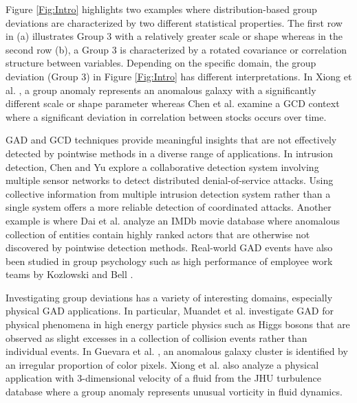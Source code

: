  Figure \ref{Fig:Intro} highlights two examples where distribution-based group deviations are characterized by two different statistical properties. The first row in (a) illustrates Group 3 with a relatively greater  scale or shape whereas in the second row (b),  a Group 3 is characterized by a rotated covariance or correlation structure between variables. 
  {  
  Depending on the specific domain, the group deviation (Group 3) in  Figure \ref{Fig:Intro} has different interpretations. In Xiong et al. \cite{MGM}, a group anomaly represents an anomalous galaxy with a significantly different scale or shape parameter whereas Chen et al. \cite{GLETS}  examine a GCD context where a significant deviation in correlation between stocks occurs over time.     
    }

 GAD and GCD  techniques provide meaningful insights that are not effectively detected by pointwise  methods  in a diverse range of applications.  
In intrusion detection,  Chen and Yu \cite{chen2016collaborative} explore  a collaborative detection system involving multiple sensor networks to detect distributed denial-of-service attacks. Using collective information from multiple intrusion detection system rather than a single system offers a more reliable detection of coordinated attacks. Another example is where Dai et al. \cite{ERACD} analyze an IMDb movie database where anomalous collection of entities contain highly ranked actors that are otherwise not discovered by pointwise detection methods.   Real-world GAD events have also been studied in group psychology such as  high  performance of employee work teams by   Kozlowski and Bell  \cite{kozlowski2003}.  

Investigating group deviations has a variety of interesting domains, especially physical GAD applications.  %
In particular,  Muandet et al.	\cite{OCSMM} investigate GAD for physical phenomena in high energy particle physics such as Higgs bosons that are observed as slight excesses in a collection of collision events rather than individual  events. In Guevara et al. \cite{SMDD}, an anomalous galaxy cluster is identified by an irregular proportion of color pixels. Xiong et al. \cite{FGM} also analyze a physical application with 3-dimensional velocity of a fluid from the  JHU turbulence database  
where a group anomaly represents unusual vorticity in  fluid dynamics.  
 

